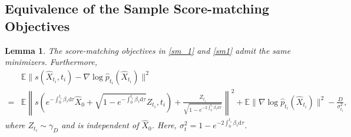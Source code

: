 \documentclass[12pts]{article}
\newtheorem{lemma}[defn]{Lemma}%
\newcommand{\diff}{\mathrm{d}}
\newcommand{\hX}{ \widehat{X}}
\newcommand{\E}{\mathbb{E}}
\newcommand{\hp}{\hat{p}}
\begin{document}
\subsection{Equivalence of the Sample Score-matching Objectives}
\begin{lemma}\label{stein}
    The score-matching objectives in \eqref{sm_1} and \eqref{sm1} admit the same minimizers. Furthermore,
    \begin{align}
        & \E  \| s(\hX_{t_i}, t_i) - \nabla \log \hp_{t_i}(\hX_{t_i})\|^2 \nonumber\\
        = & \E \left\| s\left(e^{-\int_0^{t_i} \beta_\tau \diff  \tau } \hX_0 + \sqrt{1-e^{- \int_0^{t_i} \beta_\tau \diff  \tau}} Z_{t_i} , t_i\right) + \frac{Z_{t_i}}{\sqrt{1-e^{- 2\int_0^{t_i} \beta_\tau \diff  \tau}}}  \right\|^2  + \E\| \nabla \log \hp_{t_i}(\hX_{t_i})\|^2 - \frac{D}{\sigma_{t_i}^2} \label{e30},
    \end{align}
    where $Z_{t_i} \sim \gamma_D$ and is independent of $\hX_0$. Here, $\sigma_t^2 = 1-e^{- 2\int_0^{t_i} \beta_\tau \diff  \tau}$.
\end{lemma}
\end{document}
